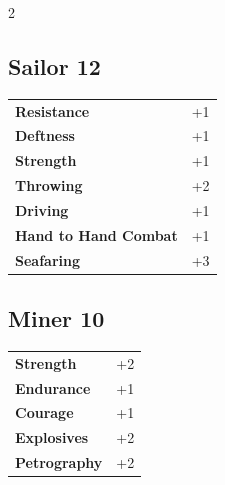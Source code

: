 \begin{multicols}{2}
\begin{tcolorbox}
    \subsection*{Sailor \hfill \small{12 }}
    \tcblower




\begin{tabular}{@{}ll@{}}
    \textbf{Resistance} & +1\\
    \textbf{Deftness} & +1\\
    \textbf{Strength} & +1\\
    \textbf{Throwing} & +2\\
    \textbf{Driving} & +1\\
    \textbf{Hand to Hand Combat} & +1\\
    \textbf{Seafaring} & +3\\
\end{tabular}


\end{tcolorbox}

\begin{tcolorbox}
    \subsection*{Miner \hfill \small{10 }}
    \tcblower




\begin{tabular}{@{}ll@{}}
    \textbf{Strength} & +2\\
    \textbf{Endurance} & +1\\
    \textbf{Courage} & +1\\
    \textbf{Explosives} & +2\\
    \textbf{Petrography} & +2\\
\end{tabular}



\end{tcolorbox}
\end{multicols}
